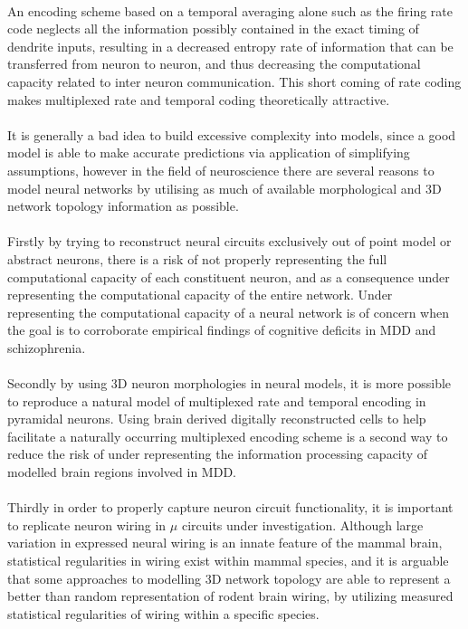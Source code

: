 \documentclass[a4paper,11pt]{article}
\begin{document}
\\
An encoding scheme based on a temporal averaging alone such as the firing rate code neglects all the information possibly contained in the exact timing of dendrite inputs, resulting in a decreased entropy rate of information that can be transferred from neuron to neuron, and thus decreasing the computational capacity related to inter neuron communication. This short coming of rate coding makes multiplexed rate and temporal coding theoretically attractive.\\
\\
It is generally a bad idea to build excessive complexity into models, since a good model is able to make accurate predictions via application of simplifying assumptions, however in the field of neuroscience there are several reasons to model neural networks by utilising as much of available morphological and 3D network topology information as possible.\\
\\
Firstly by trying to reconstruct neural circuits exclusively out of point model or abstract neurons, there is a risk of not properly representing the full computational capacity of each constituent neuron\cite{caze2013passive}, and as a consequence under representing the computational capacity of the entire network. Under representing the computational capacity of a neural network is of concern when the goal is to corroborate empirical findings of cognitive deficits in MDD and schizophrenia.\\
\\
Secondly by using 3D neuron morphologies in neural models, it is more possible to reproduce a natural model of multiplexed rate and temporal encoding in pyramidal neurons. Using brain derived digitally reconstructed cells to help facilitate a naturally occurring multiplexed encoding scheme is a second way to reduce the risk of under representing the information processing capacity of modelled brain regions involved in MDD.\\
\\
Thirdly in order to properly capture neuron circuit functionality, it is important to replicate neuron wiring in $\mu$ circuits under investigation. Although large variation in expressed neural wiring is an innate feature of the mammal brain, statistical regularities in wiring exist within mammal species, and it is arguable that some approaches to modelling 3D network topology are able to represent a better than random representation of rodent brain wiring, by utilizing measured statistical regularities of wiring within a specific species.\\
\end{document}
